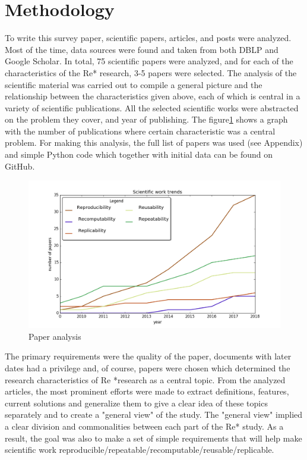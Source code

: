 \section{Methodology}
To write this survey paper, scientific papers, articles, and posts were analyzed. Most of the time, data sources were found and taken from both DBLP\cite{dblp} and Google Scholar\cite{google}. In total, 75 scientific papers were analyzed, and for each of the characteristics of the Re* research, 3-5 papers were selected. The analysis of the scientific material was carried out to compile a general picture and the relationship between the characteristics given above, each of which is central in a variety of scientific publications. All the selected scientific works were abstracted on the problem they cover, and year of publishing. The figure\ref{fig:figure1} shows a graph with the number of publications where certain characteristic was a central problem. For making this analysis, the full list of papers was used (see Appendix) and simple Python code which together with initial data can be found on GitHub\cite{gith}. 
\begin{figure}[h!]
\hspace*{-1.5cm}  
  \includegraphics[scale=0.7]{fig/figure1.png}
  \caption{Paper analysis\cite{gith}}
  \label{fig:figure1}
\end{figure} \par
The primary requirements were the quality of the paper, documents with later dates had a privilege and, of course, papers were chosen which determined the research characteristics of Re *research as a central topic. From the analyzed articles, the most prominent efforts were made to extract definitions, features, current solutions and generalize them to give a clear idea of these topics separately and to create a "general view" of the study. The "general view" implied a clear division and commonalities between each part of the Re* study. As a result, the goal was also to make a set of simple requirements that will help make scientific work reproducible/repeatable/recomputable/reusable/replicable.